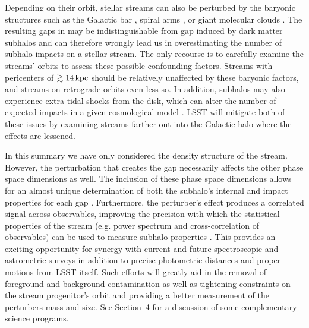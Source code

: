 Depending on their orbit, stellar streams can also be perturbed by the baryonic structures such as the Galactic bar \citep[e.g.][]{erkal2017,pearson2017}, spiral arms \citep{Banik2018}, or giant molecular clouds \citep{amorisco2016}. The resulting gaps in may be indistinguishable from gap induced by dark matter subhalos and can therefore wrongly lead us in overestimating the number of subhalo impacts on a stellar stream. The only recourse is to carefully examine the streams' orbits to assess these possible confounding factors. Streams with pericenters of $\gtrsim 14\mathrm{\,kpc}$ should be relatively unaffected by these baryonic factors, and streams on retrograde orbits even less so. In addition, subhalos may also experience extra tidal shocks from the disk, which can alter the number of expected impacts in a given cosmological model \citep[e.g.][]{DOnghia2010,Garrison-Kimmel2017}. LSST will mitigate both of these issues by examining streams farther out into the Galactic halo where the effects are lessened.

In this summary we have only considered the density structure of the stream. However, the perturbation that creates the gap necessarily affects the other phase space dimensions as well. The inclusion of these phase space dimensions allows for an almost unique determination of both the subhalo's internal and impact properties for each gap \citep{erkal2015b}. Furthermore, the perturber's effect produces a correlated signal across observables, improving the precision with which the statistical properties of the stream (e.g. power spectrum and cross-correlation of observables) can be used to measure subhalo properties \citep{bovy:2017}. This provides an exciting opportunity for synergy with current and future spectroscopic and astrometric surveys in addition to precise photometric distances and proper motions from LSST itself. Such efforts will greatly aid in the removal of foreground and background contamination as well as tightening constraints on the stream progenitor's orbit and providing a better measurement of the perturbers mass and size. See Section~4 for a discussion of some complementary science programs.


